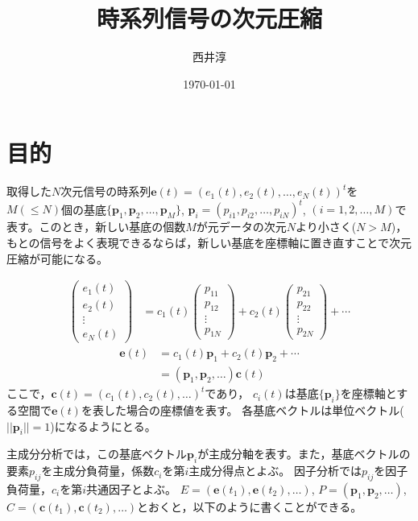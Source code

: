 \documentclass[a4paper,11pt]{jsarticle}
\begin{document}
\title{時系列信号の次元圧縮}
\author{西井淳}
\date{\today}
\maketitle

\section{目的}
取得した$N$次元信号の時系列$\bm{e}(t)=(e_1(t),e_2(t),\ldots,e_N(t))^t$を$M(\le N)$個の基底$\{\bm{p}_1,\bm{p}_2,\ldots,\bm{p}_M\}$, $\bm{p}_i=(p_{i1},p_{i2},\ldots, p_{iN})^t$, $(i=1,2,\ldots,M)$で表す。このとき，新しい基底の個数$M$が元データの次元$N$より小さく($N>M$)，もとの信号をよく表現できるならば，新しい基底を座標軸に置き直すことで次元圧縮が可能になる。

\begin{align}
\begin{pmatrix}
  e_1(t) \\
  e_2(t) \\
  \vdots\\
  e_N(t)
\end{pmatrix}
&=
c_1(t)
\begin{pmatrix}
p_{11}\\
p_{12}\\
\vdots\\
p_{1N}
\end{pmatrix}
+
c_2(t)
\begin{pmatrix}
p_{21}\\
p_{22}\\
\vdots\\
p_{2N}
\end{pmatrix}
+ \cdots
\end{align}
\begin{align}
  \bm{e}(t)&=c_1(t)\bm{p}_1+c_2(t)\bm{p}_2+\cdots\\
  &=(\bm{p}_1,\bm{p}_2,\ldots)\bm{c}(t)
\end{align}
ここで，$\bm{c}(t)=(c_1(t),c_2(t),\ldots)^t$であり，
$c_i(t)$は基底$\{\bm{p}_i\}$を座標軸とする空間で$\bm{e}(t)$を表した場合の座標値を表す。
各基底ベクトルは単位ベクトル($||\bm{p}_i||=1$)になるようにとる。

主成分分析では，この基底ベクトル$\bm{p}_i$が主成分軸を表す。また，基底ベクトルの要素$p_{ij}$を主成分負荷量，係数$c_i$を第$i$主成分得点とよぶ。
因子分析では$p_{ij}$を因子負荷量，$c_i$を第$i$共通因子とよぶ。
$E=(\bm{e}(t_1),\bm{e}(t_2),\ldots)$, $P=(\bm{p}_1,\bm{p}_2,\ldots)$, $C=(\bm{c}(t_1),\bm{c}(t_2),\ldots)$とおくと，以下のように書くことができる。
\end{document}
